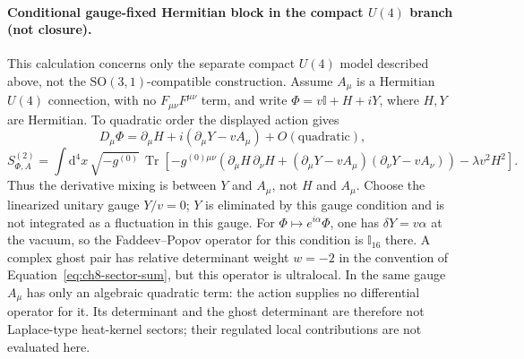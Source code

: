 \paragraph{Conditional gauge-fixed Hermitian block in the compact
\(U(4)\) branch (not closure).}
This calculation concerns only the separate compact \(U(4)\) model
described above, not the \(\mathrm{SO}(3,1)\)-compatible construction.
Assume \(A_\mu\) is a Hermitian \(U(4)\) connection, with no
\(F_{\mu\nu}F^{\mu\nu}\) term, and write
\(\Phi=v\mathbb I+H+iY\), where \(H,Y\) are Hermitian. To quadratic
order the displayed action gives
\[
  D_\mu\Phi
  =\partial_\mu H+i(\partial_\mu Y-vA_\mu)+O(\text{quadratic}),
\]
\[
  S_{\Phi,A}^{(2)}
  =\int\mathrm{d}^4x\,\sqrt{-g^{(0)}}\,
   \operatorname{Tr}\!\left[
   -g^{(0)\mu\nu}\left(
    \partial_\mu H\,\partial_\nu H+
    (\partial_\mu Y-vA_\mu)(\partial_\nu Y-vA_\nu)
   \right)-\lambda v^2H^2\right].
\]
Thus the derivative mixing is between \(Y\) and \(A_\mu\), not \(H\)
and \(A_\mu\). Choose the linearized unitary gauge \(Y/v=0\); \(Y\)
is eliminated by this gauge condition and is not integrated as a
fluctuation in this gauge. For
\(\Phi\mapsto e^{i\alpha}\Phi\), one has \(\delta Y=v\alpha\) at the
vacuum, so the Faddeev--Popov operator for this condition is
\(\mathbb I_{16}\) there. A complex ghost pair has relative
determinant weight \(w=-2\) in the convention of
Equation~\eqref{eq:ch8-sector-sum}, but this operator is ultralocal.
In the same gauge \(A_\mu\) has only an algebraic quadratic term:
the action supplies no differential operator for it. Its determinant
and the ghost determinant are therefore not Laplace-type
heat-kernel sectors; their regulated local contributions are not
evaluated here.

